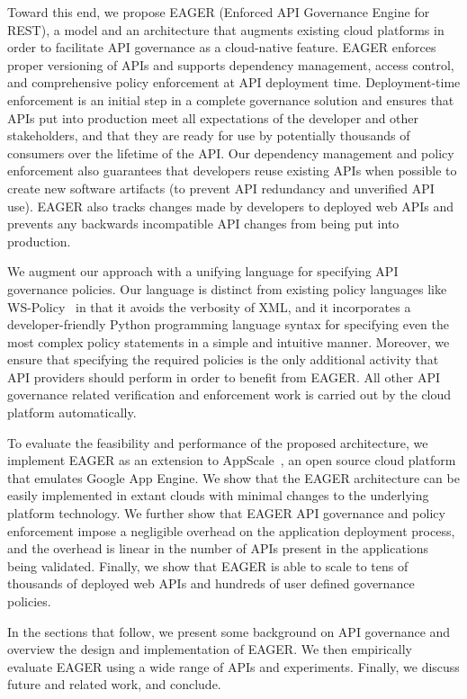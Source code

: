 Toward this end, we propose EAGER (Enforced API Governance Engine for REST), 
a model and an architecture that augments existing
cloud platforms in order to facilitate API governance as a 
cloud-native feature. EAGER enforces proper versioning of APIs and supports dependency 
management, access control, and comprehensive policy enforcement at API deployment time. 
Deployment-time enforcement is an initial step in a complete governance
solution and ensures that APIs put into production meet all expectations of
the developer and other stakeholders, and that they are ready for use
by potentially thousands of consumers over the lifetime of the API.
Our dependency management and policy enforcement also guarantees that 
developers reuse existing APIs when possible to create new software artifacts
(to prevent API redundancy and unverified API use).
EAGER also tracks changes made by developers to deployed web APIs and prevents
any backwards incompatible API changes from being put into production.

We augment our approach with a unifying language for specifying 
API governance policies. Our language is distinct from 
existing policy languages like WS-Policy~\cite{WSPolicy,soagovstandard}
in that it avoids the verbosity of XML, 
and it incorporates a developer-friendly Python programming language syntax for 
specifying even the most complex policy statements in a simple and 
intuitive manner. Moreover, we ensure that specifying the required policies 
is the only additional activity that API providers should perform in
order to benefit from EAGER. All other API governance related verification and 
enforcement work is carried out by the cloud platform automatically.

To evaluate the feasibility and performance of the proposed 
architecture, we implement EAGER as an extension to AppScale~\cite{appscale13}, 
an open source
cloud platform that emulates Google App Engine. We show that the EAGER 
architecture can be easily implemented in extant clouds with
minimal changes to the underlying platform technology. We further show that 
EAGER API governance and policy enforcement impose a negligible 
overhead on the application deployment process, and the overhead
is linear in the number of APIs present in the applications being validated.  
Finally, we show that EAGER is able to
scale to tens of thousands of deployed web APIs and hundreds of user 
defined governance policies.

In the sections that follow, we present some background on API governance
and overview the design and implementation of
EAGER. We then empirically evaluate EAGER using a wide range of APIs and
experiments.  Finally, we discuss future and related work, and conclude.
